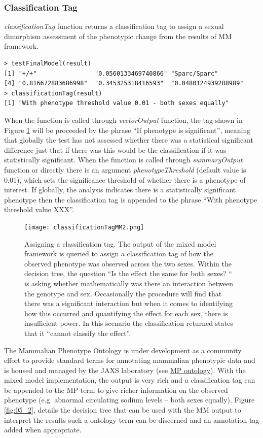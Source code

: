 \documentclass[12pt,a4paper]{article}
\begin{document}
\subsubsection{Classification Tag}
\textit{classificationTag} function returns a classification tag to assign a sexual dimorphism assessment of the phenotypic change from the results of MM framework.


\begingroup
    \fontsize{8pt}{12pt}\selectfont
\begin{verbatim}
> testFinalModel(result)
[1] "+/+"                "0.0560133469740866" "Sparc/Sparc"       
[4] "0.816672883686998"  "0.345325318416593"  "0.0480124939288989"
> classificationTag(result)
[1] "With phenotype threshold value 0.01 - both sexes equally"
\end{verbatim}
\endgroup

When the function is called through \textit{vectorOutput} function,  the tag shown in Figure \ref{fig:05} will be proceeded by the phrase “If phenotype is significant”,  meaning that globally the test has not assessed whether there was a statistical significant difference just that if there was this would be the classification if it was statistically significant.  When the function is called through \textit{summaryOutput} function or directly there is an argument \textit{phenotypeThreshold} (default value is 0.01),  which sets the significance threshold of whether there is a phenotype of interest.  If globally, the analysis indicates there is a statistically significant phenotype then the classification tag is appended to the phrase “With phenotype threshold value XXX”.

\begin{figure}[!tpb]%
\centerline{\texttt{[image: classificationTagMM2.png]}}
\caption{Assigning a classification tag. The output of the mixed model framework is queried to assign a classification tag of how the observed phenotype was observed across the two sexes. Within the decision tree, the question “Is the effect the same for both sexes? “ is asking whether mathematically was there an interaction between the  genotype and sex. Occasionally the procedure will find that there was a significant interaction but when it comes to identifying how this occurred and quantifying the effect for each sex,  there is insufficient power.  In this scenario the classification returned states  that it “cannot classify the effect”.}\label{fig:05}
\end{figure}

The Mammalian Phenotype Ontology is under development as a community effort to provide standard terms for annotating mammalian phenotypic data and is housed and managed by the JAXS laboratory (see \href{http://www.informatics.jax.org/searches/MP_form.shtml}{MP ontology}). With the mixed model implementation, the output is very rich and a classification tag can be appended to the MP term to give richer information on the observed phenotype (e.g. abnormal circulating sodium levels – both sexes equally).  Figure \ref{fig:05_2}, details the decision tree that can be used with the MM output to interpret the results such a ontology term can be discerned and an annotation tag added when appropriate.
\end{document}
